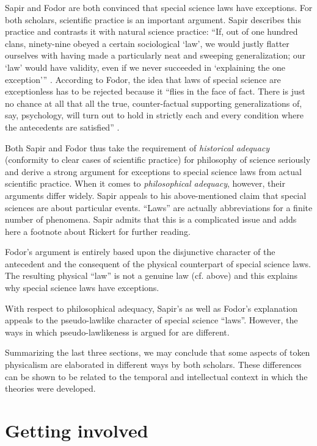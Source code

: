 \documentclass[output=paper]{langscibook}
\begin{document}
Sapir and Fodor are both convinced that special science laws have exceptions. For both scholars, scientific practice is an important argument. Sapir describes this practice and contrasts it with natural science practice: ``If, out of one  hundred clans, ninety-nine obeyed a certain sociological `law', we would justly flatter ourselves with having made a particularly neat and sweeping generalization; our `law' would have validity, even if we never succeeded in `explaining the one exception''' \citep[447]{Sapir1917}. According to Fodor, the idea that laws of special science are exceptionless has to be rejected because it ``flies in the face of fact. There is just no chance at all that all the true, counter-factual supporting generalizations of, say, psychology, will turn out to hold in strictly each and every condition where the antecedents are satisfied'' \citep[111]{Fodor1974}.

Both Sapir and Fodor thus take the requirement of \emph{historical adequacy} (conformity to clear cases of scientific practice) for philosophy of science seriously and derive a strong argument for exceptions to special science laws from actual scientific practice. When it comes to \emph{philosophical adequacy}, however, their arguments differ widely. Sapir appeals to his above-mentioned claim that special sciences are about particular events. ``Laws'' are actually abbreviations for a finite number of phenomena. Sapir admits that this is a complicated issue and adds here a footnote about Rickert for further reading.

Fodor's argument is entirely based upon the disjunctive character of the antecedent and the consequent of the physical counterpart of special science laws. The resulting physical ``law'' is not a genuine law (cf.  above) and this explains why special science laws have exceptions.

With respect to philosophical adequacy, Sapir's as well as Fodor's explanation appeals to the pseudo-lawlike character of special science ``laws''. However, the ways in which pseudo-lawlikeness is argued for are different.

Summarizing the last three sections, we may conclude that some aspects of token physicalism are elaborated in different ways by both scholars. These differences can be shown to be related to the temporal and intellectual context in which the theories were developed.

\section{Getting involved}
\label{sec:elffers:gettinginvolved}
\end{document}
